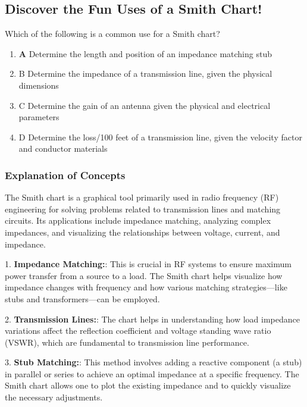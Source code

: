 \subsection{Discover the Fun Uses of a Smith Chart!}

\begin{tcolorbox}[colback=gray!10, colframe=black, title=E9G05]

Which of the following is a common use for a Smith chart? 
\begin{enumerate}
    \item \textbf{A} Determine the length and position of an impedance matching stub
    \item B Determine the impedance of a transmission line, given the physical dimensions
    \item C Determine the gain of an antenna given the physical and electrical parameters
    \item D Determine the loss/100 feet of a transmission line, given the velocity factor and conductor materials
\end{enumerate} \end{tcolorbox}

\subsubsection{Explanation of Concepts}

The Smith chart is a graphical tool primarily used in radio frequency (RF) engineering for solving problems related to transmission lines and matching circuits. Its applications include impedance matching, analyzing complex impedances, and visualizing the relationships between voltage, current, and impedance.

1. \textbf{Impedance Matching:}: This is crucial in RF systems to ensure maximum power transfer from a source to a load. The Smith chart helps visualize how impedance changes with frequency and how various matching strategies—like stubs and transformers—can be employed.

2. \textbf{Transmission Lines:}: The chart helps in understanding how load impedance variations affect the reflection coefficient and voltage standing wave ratio (VSWR), which are fundamental to transmission line performance.

3. \textbf{Stub Matching:}: This method involves adding a reactive component (a stub) in parallel or series to achieve an optimal impedance at a specific frequency. The Smith chart allows one to plot the existing impedance and to quickly visualize the necessary adjustments.

